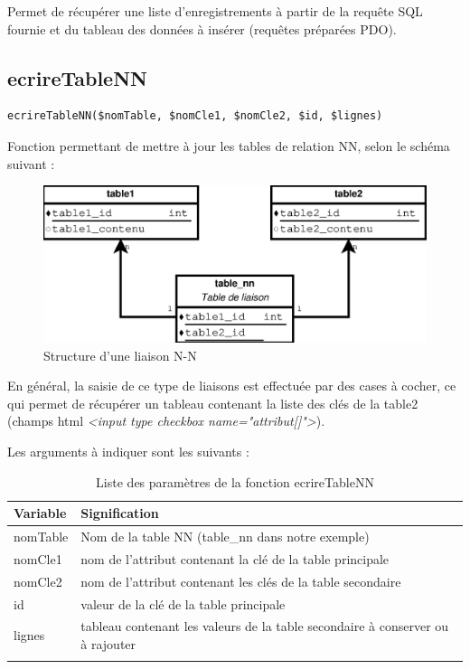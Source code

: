 Permet de récupérer une liste d'enregistrements à partir de la requête SQL fournie et du tableau des données à insérer (requêtes préparées PDO).

\subsection{ecrireTableNN}

\begin{lstlisting}
ecrireTableNN($nomTable, $nomCle1, $nomCle2, $id, $lignes)
\end{lstlisting}

Fonction permettant de mettre à jour les tables de relation NN, selon le schéma suivant :

\begin{figure}[H]
\centering
\includegraphics[width=0.8\linewidth]{dessin/schema-nn}
\caption{Structure d'une liaison N-N}
\end{figure}

En général, la saisie de ce type de liaisons est effectuée par des cases à cocher, ce qui permet de récupérer un tableau contenant la liste des clés de la table2 (champs html \textit{<input type checkbox name="attribut[]">}).

Les arguments à indiquer sont les suivants :
\begin{longtable}{|p{3cm}|p{10cm}|}
\hline
\textbf{Variable} & \textbf{Signification} \\
\hline
\endhead
nomTable & Nom de la table NN (table\_nn dans notre exemple) \\
\hline
nomCle1 & nom de l'attribut contenant la clé de la table principale \\
\hline
nomCle2 & nom de l'attribut contenant les clés de la table secondaire \\
\hline
id & valeur de la clé de la table principale \\
\hline
lignes & tableau contenant les valeurs de la table secondaire à conserver ou à rajouter \\
\hline

\caption{Liste des paramètres de la fonction ecrireTableNN}
\end{longtable}

